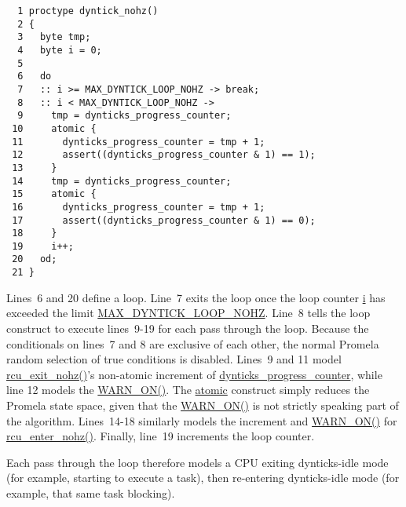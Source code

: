 { \scriptsize
\begin{verbatim}
  1 proctype dyntick_nohz()
  2 {
  3   byte tmp;
  4   byte i = 0;
  5 
  6   do
  7   :: i >= MAX_DYNTICK_LOOP_NOHZ -> break;
  8   :: i < MAX_DYNTICK_LOOP_NOHZ ->
  9     tmp = dynticks_progress_counter;
 10     atomic {
 11       dynticks_progress_counter = tmp + 1;
 12       assert((dynticks_progress_counter & 1) == 1);
 13     }
 14     tmp = dynticks_progress_counter;
 15     atomic {
 16       dynticks_progress_counter = tmp + 1;
 17       assert((dynticks_progress_counter & 1) == 0);
 18     }
 19     i++;
 20   od;
 21 }
\end{verbatim}
}

Lines~6 and 20 define a loop.
Line~7 exits the loop once the loop counter \url{i}
has exceeded the limit \url{MAX_DYNTICK_LOOP_NOHZ}.
Line~8 tells the loop construct to execute lines~9-19
for each pass through the loop.
Because the conditionals on lines~7 and 8 are exclusive of
each other, the normal Promela random selection of true conditions
is disabled.
Lines~9 and 11 model \url{rcu_exit_nohz()}'s non-atomic
increment of \url{dynticks_progress_counter}, while
line 12 models the \url{WARN_ON()}.
The \url{atomic} construct simply reduces the Promela state space,
given that the \url{WARN_ON()} is not strictly speaking part
of the algorithm.
Lines~14-18 similarly models the increment and
\url{WARN_ON()} for \url{rcu_enter_nohz()}.
Finally, line~19 increments the loop counter.

Each pass through the loop therefore models a CPU exiting
dynticks-idle mode (for example, starting to execute a task), then
re-entering dynticks-idle mode (for example, that same task blocking).

 \QuickQuizEnd

 \QuickQuizEnd

